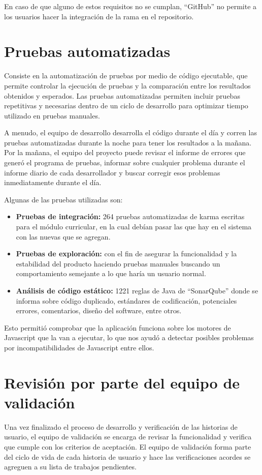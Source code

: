 En caso de que alguno de estos requisitos no se cumplan, \enquote{GitHub} no permite a los usuarios hacer la integración de la rama en el repositorio.

\section{Pruebas automatizadas}
Consiste en la automatización de pruebas por medio de código ejecutable, que permite controlar la ejecución de pruebas y la comparación entre los resultados obtenidos y esperados. Las pruebas automatizadas permiten incluir pruebas repetitivas y necesarias dentro de un ciclo de desarrollo para optimizar tiempo utilizado en pruebas manuales\citep{crispin2009agile}.

A menudo, el equipo de desarrollo desarrolla el código durante el día y corren las pruebas automatizadas durante la noche para tener los resultados a la mañana. Por la mañana, el equipo del proyecto puede revisar el informe de errores que generó el programa de pruebas, informar sobre cualquier problema durante el informe diario de cada desarrollador y buscar corregir esos problemas inmediatamente durante el día.

Algunas de las pruebas utilizadas son:
\begin{itemize}
	\item \textbf{Pruebas de integración:} 264 pruebas automatizadas de karma escritas para el módulo curricular, en la cual debían pasar las que hay en el sistema con las nuevas que se agregan.
	\item \textbf{Pruebas de exploración:} con el fin de asegurar la funcionalidad y la estabilidad del producto haciendo pruebas manuales buscando un comportamiento semejante a lo que haría un usuario normal.
	\item \textbf{Análisis de código estático:} 1221 reglas de Java de \enquote{SonarQube} donde se informa sobre código duplicado, estándares de codificación, potenciales errores, comentarios, diseño del software, entre otros.
\end{itemize}

Esto permitió comprobar que la aplicación funciona sobre los motores de Javascript que la van a ejecutar, lo que nos ayudó a detectar posibles problemas por incompatibilidades de Javascript entre ellos.

\section{Revisión por parte del equipo de validación}
Una vez finalizado el proceso de desarrollo y verificación de las historias de usuario, el equipo de validación se encarga de revisar la funcionalidad y verifica que cumple con los criterios de aceptación. El equipo de validación forma parte del ciclo de vida de cada historia de usuario y hace las verificaciones acordes se agreguen a su lista de trabajos pendientes.

